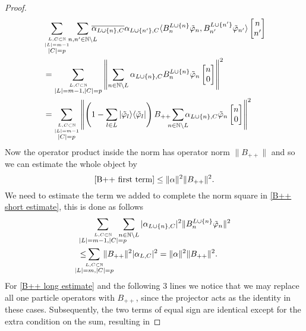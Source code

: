 \documentclass[b5paper,draft,openbib,12pt]{memoir}
\begin{document}
\begin{proof}
\begin{align}\nonumber
&\sum_{\overset{L,C\subset \mathbb{N}}{\overset{|L|=m-1}{|C|=p}}}\hspace{-0.1cm}\sum_{n,n'\in\mathbb{N}\backslash L} \hspace{-0.3cm}\overline{\alpha_{L\cup\{n\},C}}\alpha_{L\cup\{n'\},C} 
 \langle B^{L\cup\{n\}}_n \tilde{\varphi}_{n}, B^{L\cup\{n'\}}_{n'}\tilde{\varphi}_{n'}\rangle \left[\begin{matrix}n\\n'\end{matrix}\right]\\\nonumber
 &=\sum_{\overset{L,C\subset \mathbb{N}}{|L|=m-1,|C|=p}}\left\|\sum_{n\in\mathbb{N}\backslash L}\alpha_{L\cup\{n\},C}  B^{L\cup\{n\}}_n \tilde{\varphi}_{n} \left[\begin{matrix}n\\0\end{matrix}\right] \right\|^2\\\label{B++ first term}
&=\sum_{\overset{L,C\subset \mathbb{N}}{\overset{|L|=m-1}{|C|=p}}}\left\|\left(1-\sum_{l\in L}|\tilde{\varphi}_l\rangle\langle \tilde{\varphi}_l | \right)B_{++}\hspace{-0.2cm}\sum_{n\in\mathbb{N}\backslash L}\hspace{-0.2cm}\alpha_{L\cup\{n\},C}  \tilde{\varphi}_{n} \left[\begin{matrix}n\\0\end{matrix}\right]\right\|^2
\end{align}
Now the operator product inside the norm has operator norm \(\|B_{++}\|\) and so we can estimate the whole object by
\begin{equation}\label{B++estimatefinal1}
\eqref{B++ first term}\le \|\alpha\|^2 \|B_{++}\|^2.
\end{equation}
We need to estimate the term we added to complete the norm square in \eqref{B++ short estimate}, 
this is done as follows
\begin{align}\nonumber
&\sum_{\overset{L,C\subset\mathbb{N}}{|L|=m-1,|C|=p}} \hspace{-0.4cm}\sum_{n\in\mathbb{N}\backslash L} |\alpha_{L\cup\{n\},C}|^2 \|B_n^{L\cup\{n\}} \tilde{\varphi}_{n}\|^2\\\label{B++estimatefinal2}
&\le \hspace{-0.6cm}\sum_{\overset{L,C\subset\mathbb{N}}{|L|=m,|C|=p}}\hspace{-0.5cm} \|B_{++}\|^2|\alpha_{L,C}|^2 =\|\alpha\|^2 \|B_{++}\|^2.
\end{align}
For \eqref{B++ long estimate} and the following 3 lines we notice that 
we may replace all one particle operators with \(B_{++}\), since 
the projector acts as the identity in these cases. Subsequently, the 
two terms of equal sign are identical except for the extra 
condition on the sum, resulting in 


\end{proof}
\end{document}
